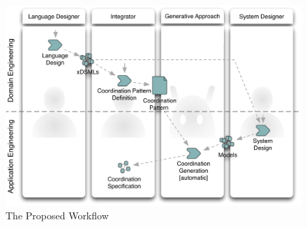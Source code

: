 	




\begin{figure}
	\begin{center}
		\includegraphics[width=.6\textwidth]{bcool/figs/process}
		\caption{The Proposed Workflow}
		\label{fig:proposedworkflow}
	\end{center}
\end{figure}


